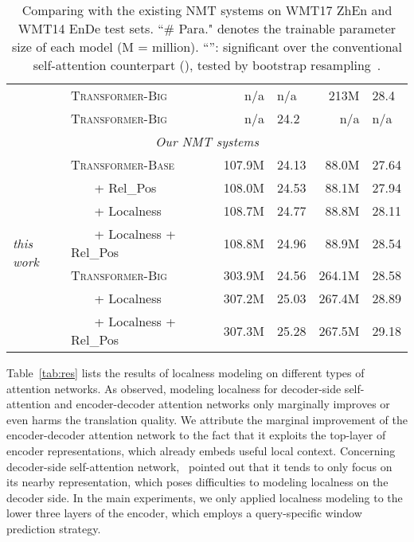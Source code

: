 \documentclass[11pt,a4paper]{article}
\begin{document}
\begin{table*}[t]
\begin{tabular}{l|l||rl|rl}
    &  \textsc{Transformer-Big}               &  n/a  &  n/a  &  213M &  28.4\\ 
    \hdashline
    \cite{hassan2018achieving}  &   \textsc{Transformer-Big}  &  n/a  &  24.2  &  n/a  & n/a\\
    \hline\hline
    \multicolumn{6}{c}{{\em Our NMT systems}}   \\ \hline
    \multirow{7}{*}{\em this work}  &   \textsc{Transformer-Base}  &    107.9M  & 24.13  &  88.0M  &   27.64\\
    &   ~~~ + Rel\_Pos \cite{shaw2018self}  & 108.0M  &   24.53 &  88.1M   &   27.94 \\  &   ~~~ + Localness                     & 108.7M  &   24.77 &  88.8M   &   28.11 \\ &   ~~~ + Localness + Rel\_Pos          & 108.8M  &   24.96 &  88.9M   &   28.54 \\ \cline{2-6}
    &   \textsc{Transformer-Big}	                & 303.9M  &   24.56 &  264.1M &  28.58   \\ &   ~~~ + Localness                     & 307.2M  &  25.03    & 267.4M  & 28.89 \\ &   ~~~ + Localness + Rel\_Pos          & 307.3M  &  25.28  & 267.5M & 29.18 \\  \end{tabular}
  \caption{Comparing with the existing NMT systems on WMT17 ZhEn and WMT14 EnDe test sets. ``\# Para." denotes the trainable parameter size of each model (M = million).  ``'': significant over the conventional self-attention counterpart (), tested by bootstrap resampling~\cite{Koehn2004Statistical}.} 
\label{tab:exist}
\end{table*}

Table~\ref{tab:res} lists the results of localness modeling on different types of attention networks. 
As observed, modeling localness for decoder-side self-attention and encoder-decoder attention networks only marginally improves or even harms the translation quality.
We attribute the marginal improvement of the encoder-decoder attention network to the fact that it exploits the top-layer of encoder representations, which already embeds useful local context.
Concerning decoder-side self-attention network,~ pointed out that it tends to only focus on its nearby representation, which poses difficulties to modeling localness on the decoder side.
In the main experiments, we only applied localness modeling to the lower three layers of the encoder, which employs a query-specific window prediction strategy.
\end{document}

